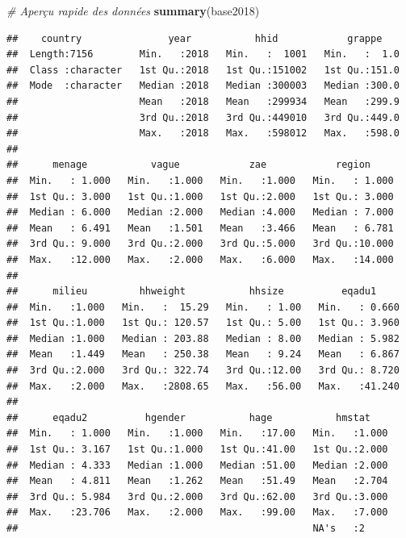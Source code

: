 \documentclass[
]{article}
\newenvironment{Shaded}{\begin{snugshade}}{\end{snugshade}}
\newcommand{\CommentTok}[1]{\textcolor[rgb]{0.56,0.35,0.01}{\textit{#1}}}
\newcommand{\FunctionTok}[1]{\textcolor[rgb]{0.13,0.29,0.53}{\textbf{#1}}}
\newcommand{\NormalTok}[1]{#1}
\begin{document}
\begin{Shaded}
\begin{Highlighting}[]
\CommentTok{\# Aperçu rapide des données}
\FunctionTok{summary}\NormalTok{(base2018)}
\end{Highlighting}
\end{Shaded}

\begin{verbatim}
##    country               year           hhid            grappe     
##  Length:7156        Min.   :2018   Min.   :  1001   Min.   :  1.0  
##  Class :character   1st Qu.:2018   1st Qu.:151002   1st Qu.:151.0  
##  Mode  :character   Median :2018   Median :300003   Median :300.0  
##                     Mean   :2018   Mean   :299934   Mean   :299.9  
##                     3rd Qu.:2018   3rd Qu.:449010   3rd Qu.:449.0  
##                     Max.   :2018   Max.   :598012   Max.   :598.0  
##                                                                    
##      menage           vague            zae            region      
##  Min.   : 1.000   Min.   :1.000   Min.   :1.000   Min.   : 1.000  
##  1st Qu.: 3.000   1st Qu.:1.000   1st Qu.:2.000   1st Qu.: 3.000  
##  Median : 6.000   Median :2.000   Median :4.000   Median : 7.000  
##  Mean   : 6.491   Mean   :1.501   Mean   :3.466   Mean   : 6.781  
##  3rd Qu.: 9.000   3rd Qu.:2.000   3rd Qu.:5.000   3rd Qu.:10.000  
##  Max.   :12.000   Max.   :2.000   Max.   :6.000   Max.   :14.000  
##                                                                   
##      milieu         hhweight           hhsize          eqadu1      
##  Min.   :1.000   Min.   :  15.29   Min.   : 1.00   Min.   : 0.660  
##  1st Qu.:1.000   1st Qu.: 120.57   1st Qu.: 5.00   1st Qu.: 3.960  
##  Median :1.000   Median : 203.88   Median : 8.00   Median : 5.982  
##  Mean   :1.449   Mean   : 250.38   Mean   : 9.24   Mean   : 6.867  
##  3rd Qu.:2.000   3rd Qu.: 322.74   3rd Qu.:12.00   3rd Qu.: 8.720  
##  Max.   :2.000   Max.   :2808.65   Max.   :56.00   Max.   :41.240  
##                                                                    
##      eqadu2          hgender           hage           hmstat     
##  Min.   : 1.000   Min.   :1.000   Min.   :17.00   Min.   :1.000  
##  1st Qu.: 3.167   1st Qu.:1.000   1st Qu.:41.00   1st Qu.:2.000  
##  Median : 4.333   Median :1.000   Median :51.00   Median :2.000  
##  Mean   : 4.811   Mean   :1.262   Mean   :51.49   Mean   :2.704  
##  3rd Qu.: 5.984   3rd Qu.:2.000   3rd Qu.:62.00   3rd Qu.:3.000  
##  Max.   :23.706   Max.   :2.000   Max.   :99.00   Max.   :7.000  
##                                                   NA's   :2      

\end{verbatim}
\end{document}
